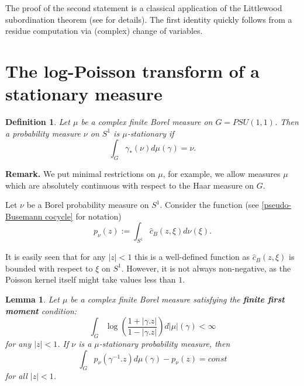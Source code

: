 \documentclass[11pt]{article}
\newtheorem{definition}{Definition}[section]
\newtheorem{lemma}{Lemma}[section]
\begin{document}
The proof of the second statement is a classical application of the Littlewood subordination theorem (see \cite{book:2131218} for details). The first identity quickly follows from a residue computation via (complex) change of variables. 

\section{The log-Poisson transform of a stationary measure}
\label{The log-Poisson transform of a stationary measure}
\begin{definition}
	Let $\mu$ be a complex finite Borel measure on $G = PSU(1,1)$. Then a probability measure $\nu$ on $S^1$ is $\mu$-stationary if
	\begin{equation}
		\label{stationary measure}
		\int_G \gamma_*(\nu) d\mu(\gamma) = \nu.
	\end{equation}
\end{definition}

\textbf{Remark.} We put minimal restrictions on $\mu$, for example, we allow measures $\mu$ which are absolutely continuous with respect to the Haar measure on $G$.

Let $\nu$ be a Borel probability measure on $S^1$. Consider the function (see \eqref{pseudo-Busemann cocycle} for notation)
\begin{equation}
	\label{def of the special function}
	p_\nu(z) := \int_{S^1} \hat{c}_B(z, \xi) d \nu(\xi).
\end{equation}

It is easily seen that for any $|z| < 1$ this is a well-defined function as $\hat{c}_B(z, \xi)$ is bounded with respect to $\xi$ on $S^1$. However, it is not always non-negative, as the Poisson kernel itself might take values less than $1$.

\begin{lemma}
	Let $\mu$ be a complex finite Borel measure satisfying the \textbf{finite first moment} condition:
	\begin{equation}
		\label{E:finite first moment}
		\int_{G} \log\left( \dfrac{1 + |\gamma.z|}{1 - |\gamma.z|} \right) d |\mu|(\gamma)  < \infty
	\end{equation} 
	for any $|z| < 1$. If $\nu$ is a $\mu$-stationary probability measure, then
	\begin{equation}
		\label{Poisson stat}
		\int_{G} p_\nu(\gamma^{-1}.z) d \mu(\gamma) - p_\nu(z) = const
	\end{equation}
	for all $|z| < 1$.
\end{lemma}
\end{document}
